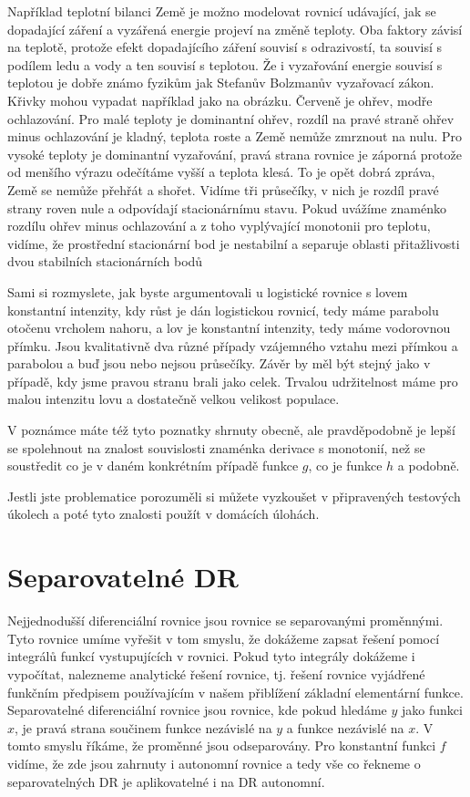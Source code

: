 \documentclass[12pt]{article}
\begin{document}
Například teplotní bilanci Země je možno modelovat rovnicí udávající, jak se dopadající záření a vyzářená energie projeví na změně teploty. Oba faktory závisí na teplotě, protože efekt dopadajícího záření souvisí s odrazivostí, ta souvisí s podílem ledu a vody a ten souvisí s teplotou. Že i vyzařování energie souvisí s teplotou je dobře známo fyzikům jak Stefanův Bolzmanův vyzařovací zákon. Křivky mohou vypadat například jako na obrázku. Červeně je ohřev, modře ochlazování. Pro malé teploty je dominantní ohřev, rozdíl na pravé straně ohřev minus ochlazování je kladný, teplota roste a Země nemůže zmrznout na nulu. Pro vysoké teploty je dominantní vyzařování, pravá strana rovnice je záporná protože od menšího výrazu odečítáme vyšší a teplota klesá. To je opět dobrá zpráva, Země se nemůže přehřát a shořet. Vidíme tři průsečíky, v nich je rozdíl pravé strany roven nule a odpovídají stacionárnímu stavu. Pokud uvážíme znaménko rozdílu ohřev minus ochlazování a z toho vyplývající monotonii pro teplotu, vidíme, že prostřední stacionární bod je nestabilní a separuje oblasti přitažlivosti dvou stabilních stacionárních bodů 


Sami si rozmyslete, jak byste argumentovali u logistické rovnice s lovem konstantní intenzity, kdy růst je dán logistickou rovnicí, tedy máme parabolu otočenu vrcholem nahoru, a lov je konstantní intenzity, tedy máme vodorovnou přímku. Jsou kvalitativně dva různé případy vzájemného vztahu mezi přímkou a parabolou a buď jsou nebo nejsou průsečíky. Závěr by měl být stejný jako v případě, kdy jsme pravou stranu brali jako celek. Trvalou udržitelnost máme pro malou intenzitu lovu a dostatečně velkou velikost populace.

V poznámce máte též tyto poznatky shrnuty obecně, ale pravděpodobně je lepší se spolehnout na znalost souvislosti znaménka derivace s monotonií, než se soustředit co je v daném konkrétním případě funkce $g$, co je funkce $h$ a podobně.

Jestli jste problematice porozuměli si můžete vyzkoušet v připravených testových úkolech a poté tyto znalosti použít v domácích úlohách. 


\section*{Separovatelné DR}

Nejjednodušší diferenciální rovnice jsou rovnice se separovanými proměnnými. Tyto rovnice umíme vyřešit v tom smyslu, že dokážeme zapsat řešení pomocí integrálů funkcí vystupujících v rovnici. Pokud tyto integrály dokážeme i vypočítat, nalezneme analytické řešení rovnice, tj. řešení rovnice vyjádřené funkčním předpisem používajícím v našem přiblížení základní elementární funkce. Separovatelné diferenciální rovnice jsou rovnice, kde pokud hledáme $y$ jako funkci $x$, je pravá strana součinem funkce nezávislé na $y$ a funkce nezávislé na $x$. V tomto smyslu říkáme, že proměnné jsou odseparovány. Pro konstantní funkci $f$ vidíme, že zde jsou zahrnuty i autonomní rovnice a tedy vše co řekneme o separovatelných DR je aplikovatelné i na DR autonomní.
\end{document}
